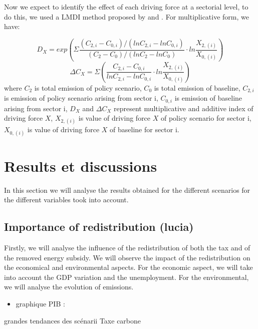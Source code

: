 \documentclass[
]{article}
\providecommand{\tightlist}{%
  \setlength{\itemsep}{0pt}\setlength{\parskip}{0pt}}
\begin{document}
Now we expect to identify the effect of each driving force at a
sectorial level, to do this, we used a LMDI method proposed by
\textcite{ang1997} and \textcite{ang2005}. For multiplicative form, we
have:

\[ D_{X} = exp ( \Sigma \frac{(C_{2,i}-C_{0,i})/(lnC_{2,i}-lnC_{0,i})}{(C_{2}-C_{0})/(lnC_{2}-lnC_{0})} \cdot ln \frac{X_{2,(i)}}{X_{0,(i)}} ) \tag{11}\]
\[ \Delta C_{X} =  \Sigma (\frac{C_{2,i}-C_{0,i}}{lnC_{2,i}-lnC_{0,i}} \cdot ln\frac{X_{2,(i)}}{X_{0,(i)}}) \tag{12} \]
where \(C_{2}\) is total emission of policy scenario, \(C_{0}\) is total
emission of baseline, \(C_{2,i}\) is emission of policy scenario arising
from sector i, \(C_{0,i}\) is emission of baseline arising from sector
i, \(D_{X}\) and \(\Delta C_{X}\) represent multiplicative and additive
index of driving force \(X\), \(X_{2,(i)}\) is value of driving force
\(X\) of policy scenario for sector i, \(X_{0,(i)}\) is value of driving
force \(X\) of baseline for sector i.

\hypertarget{results-et-discussions}{%
\section{Results et discussions}\label{results-et-discussions}}

In this section we will analyse the results obtained for the different
scenarios for the different variables took into account.

\hypertarget{importance-of-redistribution-lucia}{%
\subsection{Importance of redistribution
(lucia)}\label{importance-of-redistribution-lucia}}

Firstly, we will analyse the influence of the redistribution of both the
tax and of the removed energy subsidy. We will observe the impact of the
redistribution on the economical and environmental aspects. For the
economic aspect, we will take into account the GDP variation and the
unemployment. For the environmental, we will analyse the evolution of
emissions.

\begin{itemize}
\tightlist
\item
  graphique PIB :
\end{itemize}

grandes tendances des scénarii Taxe carbone
\end{document}
